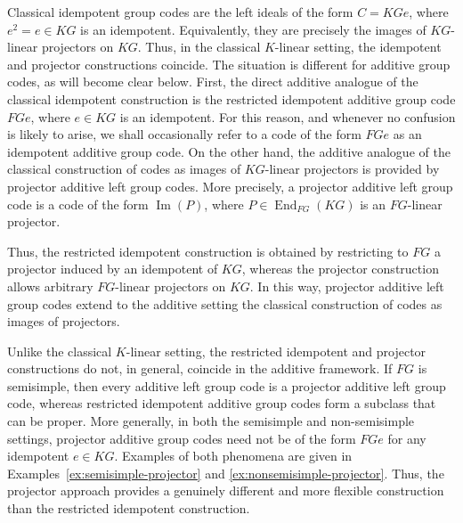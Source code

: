 \documentclass[11pt]{article}
\begin{document}
Classical idempotent group codes are the left ideals of the form $C=KGe$,
where $e^2=e\in KG$ is an idempotent. Equivalently, they are precisely the images
of $KG$-linear projectors on $KG$. Thus, in the classical $K$-linear setting,
the idempotent and projector constructions coincide. %
The situation is different for additive group codes, as will become clear
below. First, the direct additive
analogue of the classical idempotent construction is the restricted
idempotent additive group code $FGe$, where $e\in KG$ is an idempotent. For this reason, and whenever no confusion is likely to arise, we
shall occasionally refer to a code of the form $FGe$ as an idempotent
additive group code. On the other hand, the additive
analogue of the classical construction of codes as images of $KG$-linear
projectors is provided by projector additive left group codes. More
precisely, a projector additive left group code is a code of the form
$\operatorname{Im}(P)$, where $P\in\operatorname{End}_{FG}(KG)$ is an
$FG$-linear projector.

Thus, the restricted idempotent construction is obtained by restricting to
$FG$ a projector induced by an idempotent of $KG$, whereas the projector
construction allows arbitrary $FG$-linear projectors on $KG$. In this way,
projector additive left group codes extend to the additive setting the
classical construction of codes as images of projectors.



Unlike the classical $K$-linear setting, the restricted idempotent and
projector constructions do not, in general, coincide in the additive
framework. If $FG$ is semisimple, then every additive left group code is a
projector additive left group code, whereas restricted idempotent additive
group codes form a subclass that can be proper. More generally, in both the
semisimple and non-semisimple settings, projector additive group codes need
not be of the form $FGe$ for any idempotent $e\in KG$. Examples of both
phenomena are given in Examples~\ref{ex:semisimple-projector} and
\ref{ex:nonsemisimple-projector}. Thus, the projector approach provides a
genuinely different and more flexible construction than the restricted
idempotent construction.
\end{document}

